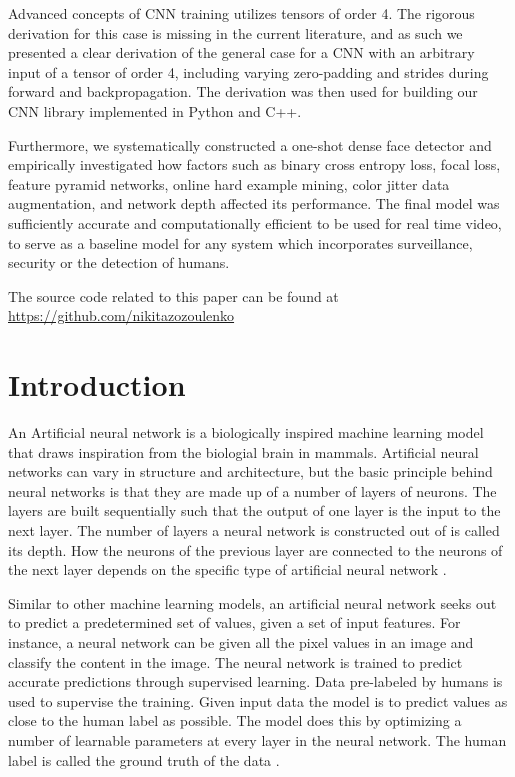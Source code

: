 \documentclass[a4paper, twoside]{article}
\begin{document}
Advanced concepts of CNN training utilizes tensors of order 4. The rigorous derivation for this case is missing in the current literature, and as such we presented a clear derivation of the general case for a CNN with an arbitrary input of a tensor of order 4, including varying zero-padding and strides during forward and backpropagation. The derivation was then used for building our CNN library implemented in Python and C++.

Furthermore, we systematically constructed a one-shot dense face detector and empirically investigated how factors such as binary cross entropy loss, focal loss, feature pyramid networks, online hard example mining, color jitter data augmentation, and network depth affected its performance. The final model was sufficiently accurate and computationally efficient to be used for real time video, to serve as a baseline model for any system which incorporates surveillance, security or the detection of humans.

The source code related to this paper can be found at \url{https://github.com/nikitazozoulenko}

\thispagestyle{empty}
\newpage

\tableofcontents
\newpage
\section{Introduction}
An Artificial neural network is a biologically inspired machine learning model that draws inspiration from the biologial brain in mammals. Artificial neural networks can vary in structure and architecture, but the basic principle behind neural networks is that they are made up of a number of layers of neurons. The layers are built sequentially such that the output of one layer is the input to the next layer. The number of layers a neural network is constructed out of is called its depth. How the neurons of the previous layer are connected to the neurons of the next layer depends on the specific type of artificial neural network \cite{cs231n}.

Similar to other machine learning models, an artificial neural network seeks out to predict a predetermined set of values, given a set of input features. For instance, a neural network can be given all the pixel values in an image and classify the content in the image. The neural network is trained to predict accurate predictions through supervised learning. Data pre-labeled by humans is used to supervise the training. Given input data the model is to predict values as close to the human label as possible. The model does this by optimizing a number of learnable parameters at every layer in the neural network. The human label is called the ground truth of the data \cite{cs231n}.
\end{document}
